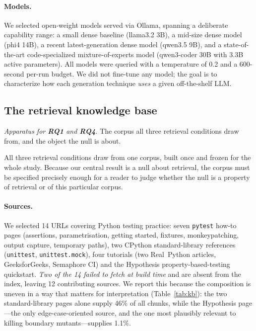 \documentclass[smallextended]{svjour3}
\begin{document}
\paragraph{Models.}
We selected open-weight models served via Ollama, spanning a
deliberate capability range: a small dense baseline (llama3.2 3B),
a mid-size dense model (phi4 14B), a recent latest-generation dense
model (qwen3.5 9B), and a state-of-the-art code-specialized
mixture-of-experts model (qwen3-coder 30B with 3.3B active
parameters). All models were queried with a temperature of 0.2 and
a 600-second per-run budget. We did not fine-tune any model; the
goal is to characterize how each generation technique \emph{uses} a
given off-the-shelf LLM.

\subsection{The retrieval knowledge base}\label{sec:methods-kb}

\emph{Apparatus for \textbf{RQ1} and \textbf{RQ4}.} The corpus all three
retrieval conditions draw from, and the object the null is about.


All three retrieval conditions draw from one corpus, built once and
frozen for the whole study. Because our central result is a null about
retrieval, the corpus must be specified precisely enough for a reader
to judge whether the null is a property of retrieval or of this
particular corpus.

\paragraph{Sources.} We selected 14 URLs covering Python testing
practice: seven \texttt{pytest} how-to pages (assertions,
parametrisation, getting started, fixtures, monkeypatching, output
capture, temporary paths), two CPython standard-library references
(\texttt{unittest}, \texttt{unittest.mock}), four tutorials
(two Real~Python articles, GeeksforGeeks, Semaphore CI) and the
Hypothesis property-based-testing quickstart. \emph{Two of the 14
failed to fetch at build time} and are absent from the index, leaving
12 contributing sources. We report this because the composition is
uneven in a way that matters for interpretation
(Table~\ref{tab:kb}): the two standard-library pages alone supply
46\% of all chunks, while the Hypothesis page---the only
edge-case-oriented source, and the one most plausibly relevant to
killing boundary mutants---supplies 1.1\%.
\end{document}
